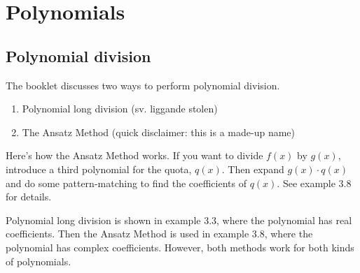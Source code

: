 \documentclass{scrreprt}
\begin{document}
\section*{Polynomials}

\subsection*{Polynomial division}

The booklet discusses two ways to perform polynomial division.

\begin{enumerate}
    \item Polynomial long division (sv. liggande stolen)
    \item The Ansatz Method (quick disclaimer: this is a made-up name)
\end{enumerate}

Here's how the Ansatz Method works. If you want to divide $f(x)$ by $g(x)$, introduce a third polynomial for the quota, $q(x)$. Then expand $g(x) \cdot q(x)$ and do some pattern-matching to find the coefficients of $q(x)$. See example 3.8 for details.

Polynomial long division is shown in example 3.3, where the polynomial has real coefficients. Then the Ansatz Method is used in example 3.8, where the polynomial has complex coefficients. However, both methods work for both kinds of polynomials.

\end{document}
